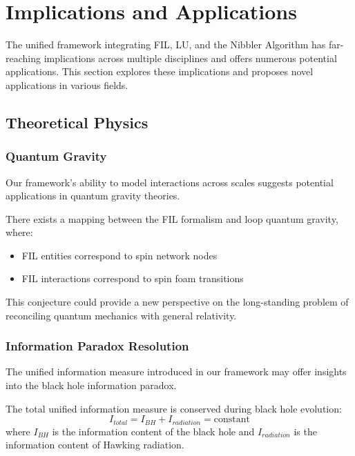 
\section{Implications and Applications}

The unified framework integrating FIL, LU, and the Nibbler Algorithm has far-reaching implications across multiple disciplines and offers numerous potential applications. This section explores these implications and proposes novel applications in various fields.

\subsection{Theoretical Physics}

\subsubsection{Quantum Gravity}

Our framework's ability to model interactions across scales suggests potential applications in quantum gravity theories.

\begin{conjecture}
There exists a mapping between the FIL formalism and loop quantum gravity, where:
\begin{itemize}
    \item FIL entities correspond to spin network nodes
    \item FIL interactions correspond to spin foam transitions
\end{itemize}
\end{conjecture}

This conjecture could provide a new perspective on the long-standing problem of reconciling quantum mechanics with general relativity.

\subsubsection{Information Paradox Resolution}

The unified information measure introduced in our framework may offer insights into the black hole information paradox.

\begin{proposition}
The total unified information measure is conserved during black hole evolution:
\begin{equation}
    I_{total} = I_{BH} + I_{radiation} = \text{constant}
\end{equation}
where $I_{BH}$ is the information content of the black hole and $I_{radiation}$ is the information content of Hawking radiation.
\end{proposition}

